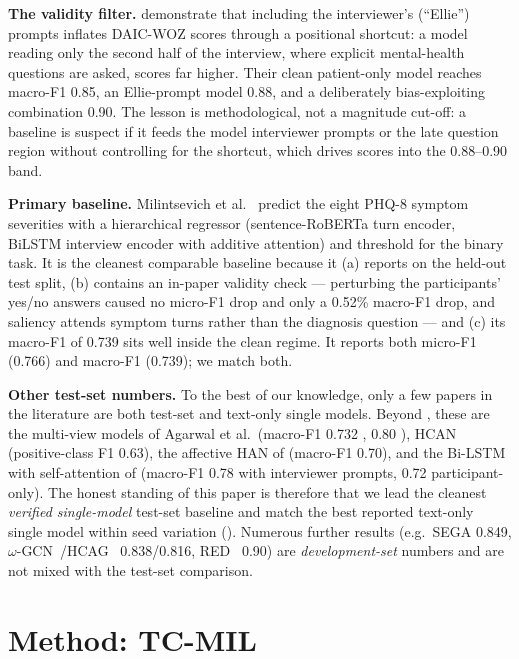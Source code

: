 \documentclass[conference]{IEEEtran}
\begin{document}
\textbf{The validity filter.} \cite{burdisso2024} demonstrate
that including the interviewer's (``Ellie'') prompts inflates DAIC-WOZ scores
through a positional shortcut: a model reading only the second half of the
interview, where explicit mental-health questions are asked, scores far higher.
Their clean patient-only model reaches macro-F1 0.85, an Ellie-prompt model
0.88, and a deliberately bias-exploiting combination 0.90. The lesson is
methodological, not a magnitude cut-off: a baseline is suspect if it feeds the
model interviewer prompts or the late question region without controlling for
the shortcut, which drives scores into the 0.88--0.90 band.

\textbf{Primary baseline.} Milintsevich et al.\ \cite{milintsevich2023}
predict the eight PHQ-8 symptom severities with a hierarchical regressor
(sentence-RoBERTa turn encoder, BiLSTM interview encoder with additive
attention) and threshold for the binary task. It is the cleanest comparable
baseline because it (a) reports on the held-out test split, (b) contains an
in-paper validity check --- perturbing the participants' yes/no answers caused
no micro-F1 drop and only a 0.52\% macro-F1 drop, and saliency attends symptom
turns rather than the diagnosis question --- and (c) its macro-F1 of 0.739
sits well inside the clean regime. It reports both micro-F1 (0.766) and
macro-F1 (0.739); we match both.

\textbf{Other test-set numbers.} To the best of our knowledge, only a few papers
in the literature are both test-set and text-only single models. Beyond
\cite{milintsevich2023}, these are the multi-view models of Agarwal et al.\
(macro-F1 0.732 \cite{agarwal2022mv}, 0.80 \cite{agarwal2024}), HCAN
\cite{mallolragolta2019} (positive-class F1 0.63), the affective HAN of
\cite{xezonaki20_interspeech} (macro-F1 0.70), and the Bi-LSTM with self-attention
of \cite{10006532} (macro-F1 0.78 with interviewer prompts, 0.72 participant-only).
The honest standing of this paper is therefore that we lead the cleanest
\emph{verified single-model} test-set baseline \cite{milintsevich2023} and match
the best reported text-only single model within seed variation
(). Numerous further results
(e.g.\ SEGA \cite{sega2024} 0.849, $\omega$-GCN~\cite{burdisso2023}/HCAG~\cite{niu2021}
0.838/0.816, RED~\cite{zhang2025} 0.90) are
\emph{development-set} numbers and are not mixed with the test-set comparison.

\section{Method: TC-MIL}
\label{sec:method}
\end{document}
